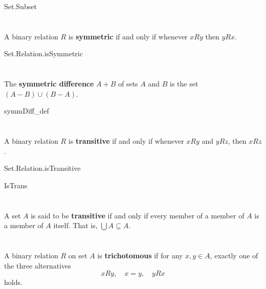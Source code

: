 \documentclass{report}
\begin{document}
    {Set.Subset}

\section{}%

  A binary relation $R$ is \textbf{symmetric} if and only if whenever $xRy$ then
    $yRx$.

    {Set.Relation.isSymmetric}

\section{}%

  The \textbf{symmetric difference} $A + B$ of sets $A$ and $B$ is the set
    $(A - B) \cup (B - A)$.

    {symmDiff\_def}

\section{}%

  A binary relation $R$ is \textbf{transitive} if and only if whenever $xRy$ and
    $yRz$, then $xRz$.

    {Set.Relation.isTransitive}

    {IsTrans}

\section{}%

  A set $A$ is said to be \textbf{transitive} if and only if every member of a
    member of $A$ is a member of $A$ itself.
  That is, $\bigcup A \subseteq A$.

\section{}%

  A binary relation $R$ on set $A$ is \textbf{trichotomous} if for any
    $x, y \in A$, exactly one of the three alternatives
    $$xRy, \quad x = y, \quad yRx$$
    holds.
\end{document}
